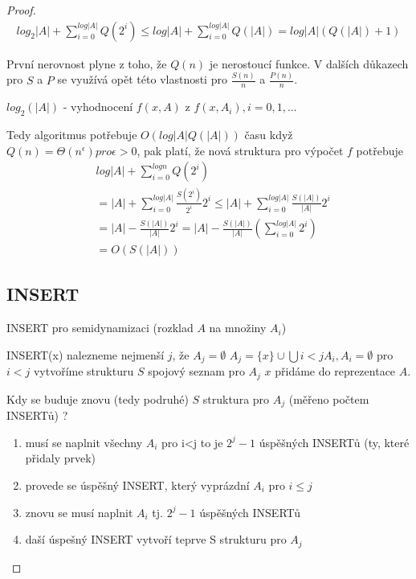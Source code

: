 \begin{proof}
\begin{multline}
log_2|A| + \sum_{i=0}^{log|A|}Q(2^i) \leq log|A| + \sum_{i=0}^{log|A|}Q(|A|)
= log|A|(Q(|A|) + 1)
\end{multline}

\begin{pozn}
První nerovnost plyne z toho, že $Q(n)$ je nerostoucí funkce. 
V dalších důkazech pro $S$ a $P$ se využívá opět této vlastnosti pro
$\frac{S(n)}{n}$ a $\frac{P(n)}{n}$.
\end{pozn}

$log_2(|A|)$ - vyhodnocení $f(x,A)$ z $f(x,A_i), i=0,1,...$
\par

Tedy algoritmus potřebuje $O(log|A| Q(|A|))$ času
když $Q(n) = \Theta(n^\epsilon) pro \epsilon > 0$, pak platí, že nová
struktura pro výpočet $f$ potřebuje
\begin{equation}
\begin{split}
& log|A| + \sum_{i=0}^{log n}Q(2^i)  \\
& = |A| + \sum_{i=0}^{log |A|}
\frac{S(2^i)}{2^i} 2^i \leq |A| + \sum_{i=0}^{log |A|} \frac{S(|A|)}{|A|} 2^i \\
& = |A| - \frac{S(|A|)}{|A|} 2^i = |A| -
\frac{S(|A|)}{|A|}(\sum_{i=0}^{log |A|} 2^i) \\
& = O(S(|A|))
\end{split}
\end{equation}

\subsection{INSERT}


\begin{algorithm}[!htb]
\caption{INSERT pro semidynamizaci (rozklad $A$ na množiny $A_i$)}
\label{alg:semidyn.insert}
\begin{algorithmic}
\STATE INSERT(x)
  \STATE nalezneme nejmenší $j$, že $A_j = \emptyset$
\ENDIF
\STATE $A_j = \{x\} \cup \bigcup{i<j} A_i, A_i = \emptyset$ pro $i<j$
\STATE vytvoříme strukturu $S$ spojový seznam pro $A_j$
\STATE $x$ přidáme do reprezentace $A$.
\end{algorithmic}
\end{algorithm}


Kdy se buduje znovu (tedy podruhé) $S$ struktura pro $A_j$ (měřeno počtem
INSERTů) ?
\begin{enumerate}
\item musí se naplnit všechny $A_i$ pro i<j 
to je $2^j-1$ úspěšných INSERTů (ty, které přidaly prvek)
\item provede se úspěšný INSERT, který vyprázdní $A_i$ pro $i \leq j$
\item znovu se musí naplnit $A_i$ tj. $2^j-1$ úspěšných INSERTů
\item daší úspešný INSERT vytvoří teprve S strukturu pro $A_j$
\end{enumerate}


\end{proof}
